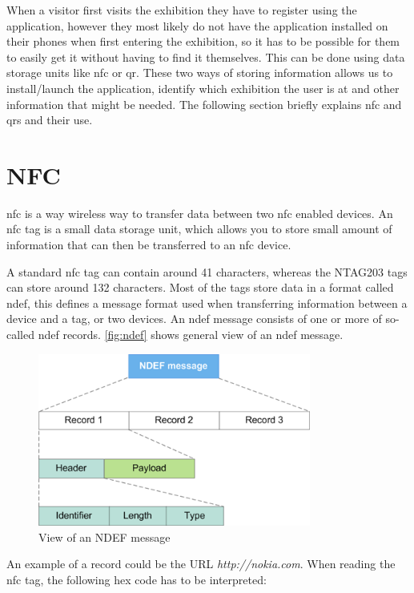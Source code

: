 When a visitor first visits the exhibition they have to register using the application, however they most likely do not have the application installed on their phones when first entering the exhibition, so it has to be possible for them to easily get it without having to find it themselves. This can be done using data storage units like \ac{nfc} or \ac{qr}. These two ways of storing information allows us to install/launch the application, identify which exhibition the user is at and other information that might be needed. The following section briefly explains \ac{nfc} and \ac{qr}s and their use. 

\section{NFC}
\ac{nfc} is a way wireless way to transfer data between two \ac{nfc} enabled devices. 
An \ac{nfc} tag is a small data storage unit, which allows you to store small amount of information that can then be transferred to an \ac{nfc} device. 

A standard \ac{nfc} tag can contain around 41 characters, whereas the NTAG203 tags can store around 132 characters\citep{nfccap}. Most of the tags store data in a format called \ac{ndef}, this defines a message format used when transferring information between a device and a tag, or two devices. An \ac{ndef} message consists of one or more of so-called \ac{ndef} records. \autoref{fig:ndef} shows general view of an \ac{ndef} message.

\begin{figure}[H]
\centering
\includegraphics[width=0.8\textwidth]{img/nfcrecord.png}
\caption{View of an NDEF message\citep{ndef}}
\label{fig:ndef}
\end{figure}

An example of a record could be the URL \textit{http://nokia.com}. When reading the \ac{nfc} tag, the following hex code has to be interpreted: 

